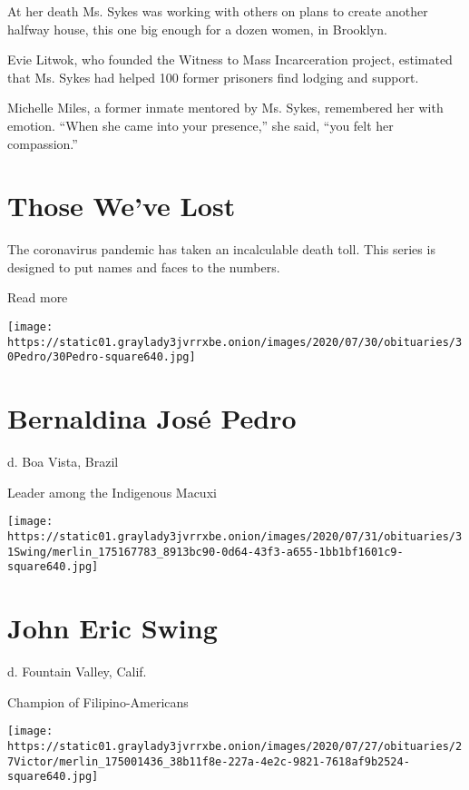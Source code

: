 At her death Ms. Sykes was working with others on plans to create
another halfway house, this one big enough for a dozen women, in
Brooklyn.

Evie Litwok, who founded the Witness to Mass Incarceration project,
estimated that Ms. Sykes had helped 100 former prisoners find lodging
and support.

Michelle Miles, a former inmate mentored by Ms. Sykes, remembered her
with emotion. ``When she came into your presence,'' she said, ``you felt
her compassion.''

\href{https://www.nytimes3xbfgragh.onion/interactive/2020/obituaries/people-died-coronavirus-obituaries.html?action=click\&pgtype=Article\&state=default\&region=BELOW_MAIN_CONTENT\&context=covid_obits_promo}{}

\hypertarget{those-weve-lost}{%
\section{Those We've Lost}\label{those-weve-lost}}

The coronavirus pandemic has taken an incalculable death toll. This
series is designed to put names and faces to the numbers.

Read more

\texttt{[image: https://static01.graylady3jvrrxbe.onion/images/2020/07/30/obituaries/30Pedro/30Pedro-square640.jpg]}

\hypertarget{bernaldina-josuxe9-pedro}{%
\section{Bernaldina José Pedro}\label{bernaldina-josuxe9-pedro}}

d. Boa Vista, Brazil

Leader among the Indigenous Macuxi

\texttt{[image: https://static01.graylady3jvrrxbe.onion/images/2020/07/31/obituaries/31Swing/merlin\_175167783\_8913bc90-0d64-43f3-a655-1bb1bf1601c9-square640.jpg]}

\hypertarget{john-eric-swing}{%
\section{John Eric Swing}\label{john-eric-swing}}

d. Fountain Valley, Calif.

Champion of Filipino-Americans

\texttt{[image: https://static01.graylady3jvrrxbe.onion/images/2020/07/27/obituaries/27Victor/merlin\_175001436\_38b11f8e-227a-4e2c-9821-7618af9b2524-square640.jpg]}

